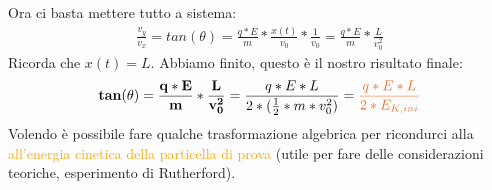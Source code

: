             Ora ci basta mettere tutto a sistema:
            \begin{align*}
                \frac{v_y}{v_x} = tan(\theta) = \frac{q*E}{m}*\frac{x(t)}{v_0} *\frac{1}{v_0} = \frac{q*E}{m} * \frac{L}{v_0^2}
            \end{align*}
            Ricorda che $x(t) = L$. Abbiamo finito, questo è il nostro risultato finale:
            \begin{align*}
                \mathbf{tan(\theta) = \frac{q*E}{m} * \frac{L}{v_0^2}} = \frac{q*E*L}{2*(\frac{1}{2}*m*v_0^2)} = \textcolor{Orange}{\frac{q*E*L}{2*E_{K, ini}}}
            \end{align*}
            Volendo è possibile fare qualche trasformazione algebrica per ricondurci alla \textcolor{Orange}{all'energia cinetica della particella di prova} (utile per fare delle considerazioni teoriche, esperimento di Rutherford).
